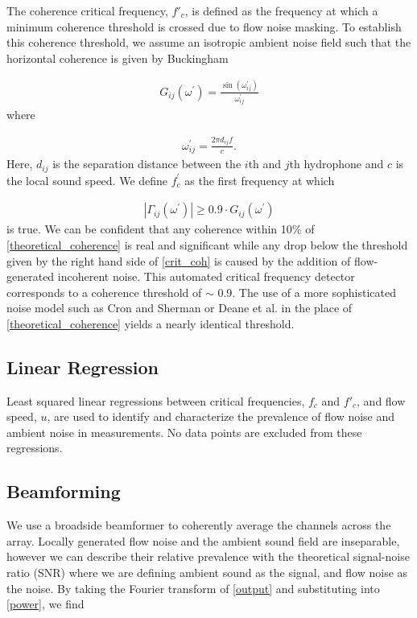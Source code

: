 \documentclass[12pt,journal,onecolumn]{IEEEtran}
\begin{document}
The coherence critical frequency, $f'_c$, is defined as the frequency at which a minimum coherence threshold is crossed due to flow noise masking. To establish this coherence threshold, we assume an isotropic ambient noise field such that the horizontal coherence is given by Buckingham \cite{buck}

\begin{align}
G_{ij}(\omega^\prime) = \frac{\sin (\omega_{ij}^\prime)}{\omega_{ij}^\prime}
\label{theoretical_coherence}
\end{align}
where

\begin{align}
\omega_{ij}^\prime = \frac{2\pi d_{ij}f }{c}.
\label{w}
\end{align}
Here, $d_{ij}$ is the separation distance between the $i$th and $j$th hydrophone and $c$ is the local sound speed. We define $f^\prime_c$ as the first frequency at which 

\begin{align}
|\Gamma_{ij}(\omega^\prime)|\geq  0.9\cdot G_{ij}(\omega^\prime)
\label{crit_coh}
\end{align}
is true. 
We can be confident that any coherence within 10\% of \eqref{theoretical_coherence} is real and significant while any drop below the threshold given by the right hand side of \eqref{crit_coh} is caused by the addition of flow-generated incoherent noise. 
This automated critical frequency detector corresponds to a coherence threshold of $\sim$ 0.9. The use of a more sophisticated noise model such as Cron and Sherman \cite{cron} or Deane et al. \cite{deane} in the place of \eqref{theoretical_coherence} yields a nearly identical threshold.



\subsection{Linear Regression}

Least squared linear regressions between critical frequencies,  $f_c$ and $f'_c$, and flow speed, $u$, are used to identify and characterize the prevalence of flow noise and ambient noise in measurements. No data points are excluded from these regressions.



\subsection{Beamforming }

We use a broadside beamformer to coherently average the channels across the array. Locally generated flow noise and the ambient sound field are inseparable, however we can describe their relative prevalence with the theoretical signal-noise ratio (SNR) where we are defining ambient sound as the signal, and flow noise as the noise. By taking the Fourier transform of \eqref{output} and substituting into \eqref{power}, we find
\end{document}
